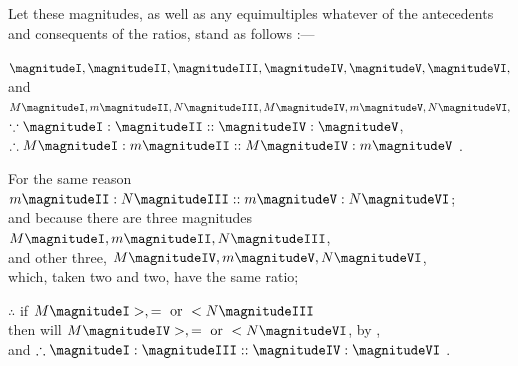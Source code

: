 \documentclass[booklanguage=english]{byrnebook}
\begin{document}
Let these magnitudes, as well as any equimultiples whatever of the antecedents and consequents of the ratios, stand as follows :—

\begin{center}
$\magnitudeI, \magnitudeII, \magnitudeIII, \magnitudeIV, \magnitudeV, \magnitudeVI,$\\
and\\
$M \magnitudeI, m \magnitudeII, N \magnitudeIII, M \magnitudeIV, m \magnitudeV, N \magnitudeVI,$\\
$\because \magnitudeI : \magnitudeII :: \magnitudeIV : \magnitudeV$,\\ %
$\therefore M \magnitudeI : m \magnitudeII :: M \magnitudeIV : m \magnitudeV$ .

For the same reason\\
$m \magnitudeII : N \magnitudeIII :: m \magnitudeV : N \magnitudeVI$;\\
and because there are three magnitudes\\
$M \magnitudeI, m \magnitudeII, N \magnitudeIII$,\\
and other three, $M \magnitudeIV, m \magnitudeV, N \magnitudeVI$,\\
which, taken two and two, have the same ratio;

$\therefore$ if $M \magnitudeI >, = \mbox{ or } < N \magnitudeIII$\\
then will $M \magnitudeIV >, = \mbox{ or } < N \magnitudeVI$, by ,\\
and $\therefore \magnitudeI : \magnitudeIII :: \magnitudeIV : \magnitudeVI$ .


\end{center}
\end{document}
